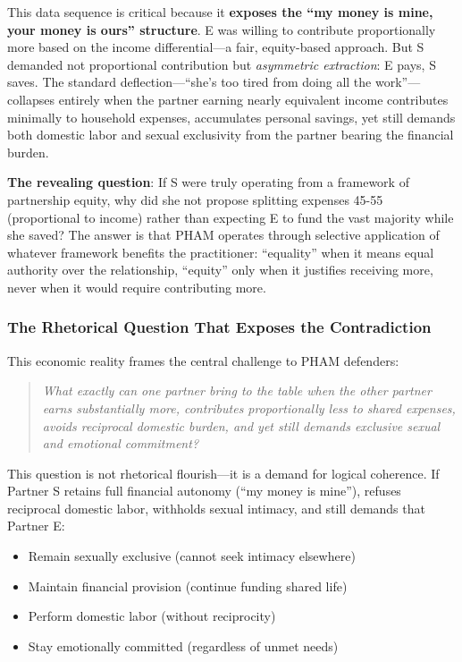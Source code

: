 \documentclass[12pt, letterpaper]{article}
\begin{document}
This data sequence is critical because it \textbf{exposes the ``my money is mine, your money is ours'' structure}. E was willing to contribute proportionally more based on the income differential---a fair, equity-based approach. But S demanded not proportional contribution but \textit{asymmetric extraction}: E pays, S saves. The standard deflection---``she's too tired from doing all the work''---collapses entirely when the partner earning nearly equivalent income contributes minimally to household expenses, accumulates personal savings, yet still demands both domestic labor and sexual exclusivity from the partner bearing the financial burden.

\textbf{The revealing question}: If S were truly operating from a framework of partnership equity, why did she not propose splitting expenses 45-55 (proportional to income) rather than expecting E to fund the vast majority while she saved? The answer is that PHAM operates through selective application of whatever framework benefits the practitioner: ``equality'' when it means equal authority over the relationship, ``equity'' only when it justifies receiving more, never when it would require contributing more.

\subsubsection{The Rhetorical Question That Exposes the Contradiction}

This economic reality frames the central challenge to PHAM defenders:

\begin{quote}
\textit{What exactly can one partner bring to the table when the other partner earns substantially more, contributes proportionally less to shared expenses, avoids reciprocal domestic burden, and yet still demands exclusive sexual and emotional commitment?}
\end{quote}

This question is not rhetorical flourish---it is a demand for logical coherence. If Partner S retains full financial autonomy (``my money is mine''), refuses reciprocal domestic labor, withholds sexual intimacy, and still demands that Partner E:

\begin{itemize}
    \item Remain sexually exclusive (cannot seek intimacy elsewhere)
    \item Maintain financial provision (continue funding shared life)
    \item Perform domestic labor (without reciprocity)
    \item Stay emotionally committed (regardless of unmet needs)
\end{itemize}
\end{document}

